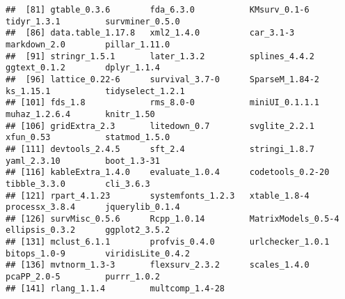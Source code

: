 \documentclass[
]{article}
\begin{document}
\begin{verbatim}
##  [81] gtable_0.3.6        fda_6.3.0           KMsurv_0.1-6        tidyr_1.3.1         survminer_0.5.0    
##  [86] data.table_1.17.8   xml2_1.4.0          car_3.1-3           markdown_2.0        pillar_1.11.0      
##  [91] stringr_1.5.1       later_1.3.2         splines_4.4.2       ggtext_0.1.2        dplyr_1.1.4        
##  [96] lattice_0.22-6      survival_3.7-0      SparseM_1.84-2      ks_1.15.1           tidyselect_1.2.1   
## [101] fds_1.8             rms_8.0-0           miniUI_0.1.1.1      muhaz_1.2.6.4       knitr_1.50         
## [106] gridExtra_2.3       litedown_0.7        svglite_2.2.1       xfun_0.53           statmod_1.5.0      
## [111] devtools_2.4.5      sft_2.4             stringi_1.8.7       yaml_2.3.10         boot_1.3-31        
## [116] kableExtra_1.4.0    evaluate_1.0.4      codetools_0.2-20    tibble_3.3.0        cli_3.6.3          
## [121] rpart_4.1.23        systemfonts_1.2.3   xtable_1.8-4        processx_3.8.4      jquerylib_0.1.4    
## [126] survMisc_0.5.6      Rcpp_1.0.14         MatrixModels_0.5-4  ellipsis_0.3.2      ggplot2_3.5.2      
## [131] mclust_6.1.1        profvis_0.4.0       urlchecker_1.0.1    bitops_1.0-9        viridisLite_0.4.2  
## [136] mvtnorm_1.3-3       flexsurv_2.3.2      scales_1.4.0        pcaPP_2.0-5         purrr_1.0.2        
## [141] rlang_1.1.4         multcomp_1.4-28
\end{verbatim}
\end{document}
